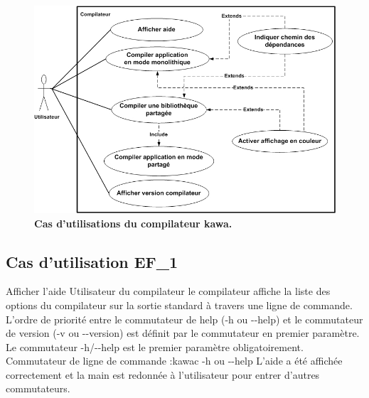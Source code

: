 \begin{figure}
  \centering
  \includegraphics[scale=0.8]{../res/stb/vs_finale_usecase1.jpg}
  \caption{\textbf{Cas d'utilisations du compilateur kawa.}}
\end{figure}

\subsection{Cas d'utilisation EF\_1}
\fiche
{Afficher l'aide}                    %
{Utilisateur du compilateur}                               %
{                                                %
  le compilateur affiche 
   la liste des options du compilateur sur la sortie standard à travers une ligne de commande.
}
{
  L'ordre de priorité entre le commutateur de help (-h ou -\hspace{0.1mm}-help) et le commutateur de version (-v ou -\hspace{0.1mm}-version) est définit par le commutateur en premier paramètre. Le commutateur -h/-\hspace{0.1mm}-help est le premier paramètre obligatoirement.
}                                                %
{Commutateur de ligne de commande :kawac -h ou -\hspace{0.1mm}-help }                             %
{L'aide a été affichée correctement et la main est redonnée à l'utilisateur pour entrer d'autres commutateurs.}                       %
{} %
{} %
{} %

